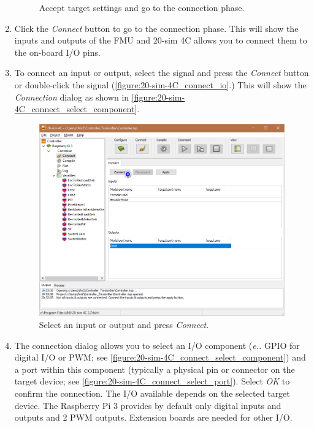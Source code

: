 \begin{enumerate}
\begin{figure}[hpt]
	\caption{Accept target settings and go to the connection phase.}
	\label{figure:20-sim-4C_connect}
\end{figure}
%
\item Click the \textit{Connect} button to go to the connection phase. This will show the inputs and outputs of the FMU and 20-sim 4C allows you to connect them to the on-board I/O pins.
%
\item To connect an input or output,  select the signal and press the \textit{Connect} button or double-click the signal (\autoref{figure:20-sim-4C_connect_io}.)  This will show the \textit{Connection} dialog as shown in \autoref{figure:20-sim-4C_connect_select_component}.
%
\begin{figure}[hpt]
	\centerline{\includegraphics[width=\textwidth]{figures/20-sim-4C_connect_io.png}}
	\caption{Select an input or output and press \emph{Connect}.}
	\label{figure:20-sim-4C_connect_io}
\end{figure}
%
\item The connection dialog allows you to select an I/O component (\emph{e.\@g.\@} GPIO for digital I/O or PWM; see \autoref{figure:20-sim-4C_connect_select_component}) and a port within this component (typically a physical pin or connector on the target device; see \autoref{figure:20-sim-4C_connect_select_port}).  Select \textit{OK} to confirm the connection.  The I/O available depends on the selected target device.  The Raspberry Pi 3 provides by default only digital inputs and outputs and 2 PWM outputs.  Extension boards are needed for other I/O.\\

\end{enumerate}
